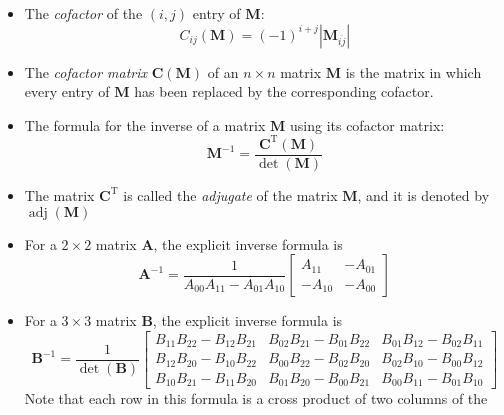 \documentclass[11pt]{article}
\newcommand{\bm}[1]{\mathbf{#1}}
\DeclareMathOperator{\adj}{adj}
\begin{document}
    \begin{itemize}
    \item The \textit{cofactor} of the $(i, j)$ entry of $\bm{M}$:
        \begin{equation}
            C_{ij} \left(\bm{M}\right) = \left(-1\right)^{i+j} \left| \bm{M}_{\overline{ij}} \right|
        \end{equation}
    \item The \textit{cofactor matrix} $\bm{C}\left(\bm{M}\right)$ of an $n \times n$
        matrix $\bm{M}$ is the matrix in which every entry of $\bm{M}$ has been
        replaced by the corresponding cofactor.
    \item The formula for the inverse of a matrix $\bm{M}$ using its cofactor matrix:
        \begin{equation}
            \bm{M}^{-1} = \frac{\bm{C}^{\text{T}} \left(\bm{M}\right)}{\det \left(\bm{M}\right)}
        \end{equation}
    \item The matrix $\bm{C}^{\text{T}}$ is called the \textit{adjugate} of the matrix $\bm{M}$,
        and it is denoted by $\adj \left(\bm{M}\right)$
    \item For a $2 \times 2$ matrix $\bm{A}$, the explicit inverse formula is
        \begin{equation}
            \bm{A}^{-1} = \frac{1}{A_{00}A_{11} - A_{01}A_{10}}
            \begin{bmatrix}
                A_{11} & -A_{01} \\
                -A_{10} & -A_{00}
            \end{bmatrix}
        \end{equation}
    \item For a $3 \times 3$ matrix $\bm{B}$, the explicit inverse formula is
        \begin{equation}
            \bm{B}^{-1} = \frac{1}{\det \left(\bm{B}\right)}
            \begin{bmatrix}
                B_{11}B_{22}-B_{12}B_{21} & B_{02}B_{21}-B_{01}B_{22} & B_{01}B_{12}-B_{02}B_{11} \\
                B_{12}B_{20}-B_{10}B_{22} & B_{00}B_{22}-B_{02}B_{20} & B_{02}B_{10}-B_{00}B_{12} \\
                B_{10}B_{21}-B_{11}B_{20} & B_{01}B_{20}-B_{00}B_{21} & B_{00}B_{11}-B_{01}B_{10}
            \end{bmatrix}
        \end{equation}
        Note that each row in this formula is a cross product of two columns of the

\end{itemize}
\end{document}
